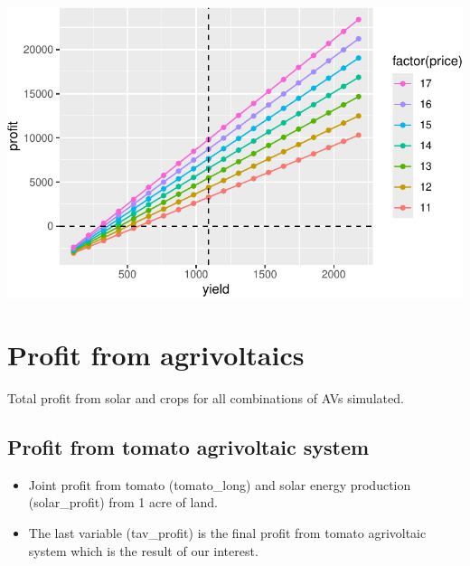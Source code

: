 \documentclass[
  letterpaper,
  DIV=11,
  numbers=noendperiod]{scrartcl}
\providecommand{\tightlist}{%
  \setlength{\itemsep}{0pt}\setlength{\parskip}{0pt}}\usepackage{longtable,booktabs,array}
\begin{document}
\includegraphics{Simulation_files/figure-pdf/unnamed-chunk-37-1.pdf}

\section{Profit from agrivoltaics}\label{profit-from-agrivoltaics}

Total profit from solar and crops for all combinations of AVs simulated.

\subsection{Profit from tomato agrivoltaic
system}\label{profit-from-tomato-agrivoltaic-system}

\begin{itemize}
\tightlist
\item
  Joint profit from tomato (tomato\_long) and solar energy production
  (solar\_profit) from 1 acre of land.
\item
  The last variable (tav\_profit) is the final profit from tomato
  agrivoltaic system which is the result of our interest.
\end{itemize}
\end{document}
